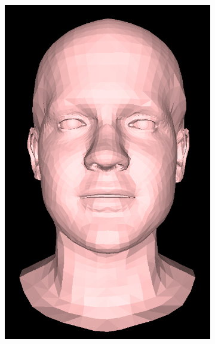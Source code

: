 \begin{figure}[h!]
\begin{subfigure}[b]{0.19\textwidth}
        \includegraphics[width=\textwidth]{figures/gen_sample/00005.png}
    \end{subfigure}
    \begin{subfigure}[b]{0.19\textwidth}

\end{subfigure}
\end{figure}

